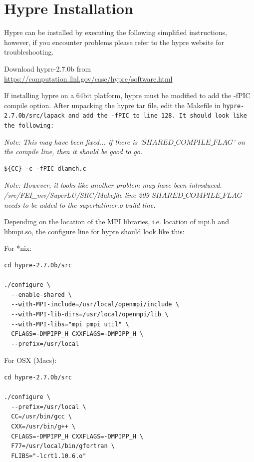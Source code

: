 \documentclass[12pt]{article}
\begin{document}
\section{Hypre Installation}

Hypre can be installed by executing the following simplified
instructions, however, if you encounter problems please refer to the
hypre website for troubleshooting.

Download hypre-2.7.0b from
\url{https://computation.llnl.gov/casc/hypre/software.html}

If installing hypre on a 64bit platform, hypre must be modified to add
the -fPIC compile option.  After unpacking the hypre tar file, edit
the Makefile in \tt hypre-2.7.0b/src/lapack \normalfont and add the
-fPIC to line 128.  It should look like the following:

\emph{Note: This may have been fixed... if there is
  '${SHARED\_COMPILE\_FLAG}$' on the compile line, then it should be good
to go.}

\begin{verbatim}
${CC} -c -fPIC dlamch.c
\end{verbatim}

\emph{Note: However, it looks like another problem may have been
  introduced.  /src/FEI\_mv/SuperLU/SRC/Makefile line 209
  ${SHARED\_COMPILE\_FLAG}$ needs to be added to the superlutimer.o
  build line.
}

Depending on the location of the MPI libraries, i.e. location of mpi.h
and libmpi.so, the configure line for hypre should look like this:

For *nix:

\begin{verbatim}
cd hypre-2.7.0b/src

./configure \
  --enable-shared \
  --with-MPI-include=/usr/local/openmpi/include \
  --with-MPI-lib-dirs=/usr/local/openmpi/lib \
  --with-MPI-libs="mpi pmpi util" \
  CFLAGS=-DMPIPP_H CXXFLAGS=-DMPIPP_H \
  --prefix=/usr/local
\end{verbatim}

For OSX (Macs):

\begin{verbatim}
cd hypre-2.7.0b/src

./configure \
  --prefix=/usr/local \
  CC=/usr/bin/gcc \
  CXX=/usr/bin/g++ \
  CFLAGS=-DMPIPP_H CXXFLAGS=-DMPIPP_H \
  F77=/usr/local/bin/gfortran \
  FLIBS="-lcrt1.10.6.o"

\end{verbatim}
\end{document}

